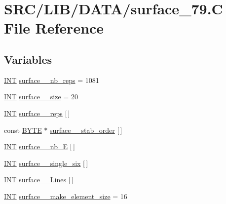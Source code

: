 \hypertarget{surface__79_8_c}{}\section{S\+R\+C/\+L\+I\+B/\+D\+A\+T\+A/surface\+\_\+79.C File Reference}
\label{surface__79_8_c}
\subsection*{Variables}
\begin{DoxyCompactItemize}
\item 
\mbox{\hyperlink{galois_8h_a09fddde158a3a20bd2dcadb609de11dc}{I\+NT}} \mbox{\hyperlink{surface__79_8_c_aaba9fb2b17c5c35e963b9c28d6baafbd}{surface\+\_\+\_\+nb\+\_\+reps}} = 1081
\item 
\mbox{\hyperlink{galois_8h_a09fddde158a3a20bd2dcadb609de11dc}{I\+NT}} \mbox{\hyperlink{surface__79_8_c_a3bbf96a9de8aca68f242f6f7635707f6}{surface\+\_\+\_\+size}} = 20
\item 
\mbox{\hyperlink{galois_8h_a09fddde158a3a20bd2dcadb609de11dc}{I\+NT}} \mbox{\hyperlink{surface__79_8_c_a731d3a531b09973fe06c532d174a0e81}{surface\+\_\+\_\+reps}} \mbox{[}$\,$\mbox{]}
\item 
const \mbox{\hyperlink{galois_8h_ab6cc7b4aeb6ea31aba2b3fbfc83ff5e6}{B\+Y\+TE}} $\ast$ \mbox{\hyperlink{surface__79_8_c_a31ee93a24fa0ca678989bb6d871feaa5}{surface\+\_\+\_\+stab\+\_\+order}} \mbox{[}$\,$\mbox{]}
\item 
\mbox{\hyperlink{galois_8h_a09fddde158a3a20bd2dcadb609de11dc}{I\+NT}} \mbox{\hyperlink{surface__79_8_c_abe69638ed1eb420bd80e5fd0ffcfa4f1}{surface\+\_\+\_\+nb\+\_\+E}} \mbox{[}$\,$\mbox{]}
\item 
\mbox{\hyperlink{galois_8h_a09fddde158a3a20bd2dcadb609de11dc}{I\+NT}} \mbox{\hyperlink{surface__79_8_c_aabacc0ac55494cd822387a08337f2083}{surface\+\_\+\_\+single\+\_\+six}} \mbox{[}$\,$\mbox{]}
\item 
\mbox{\hyperlink{galois_8h_a09fddde158a3a20bd2dcadb609de11dc}{I\+NT}} \mbox{\hyperlink{surface__79_8_c_ad35e5b643eebf25b4e31f824c684f8a8}{surface\+\_\+\_\+\+Lines}} \mbox{[}$\,$\mbox{]}
\item 
\mbox{\hyperlink{galois_8h_a09fddde158a3a20bd2dcadb609de11dc}{I\+NT}} \mbox{\hyperlink{surface__79_8_c_ae5fb05ba0325f9018ac99bca4cf1d456}{surface\+\_\+\_\+make\+\_\+element\+\_\+size}} = 16
\item 

\end{DoxyCompactItemize}
